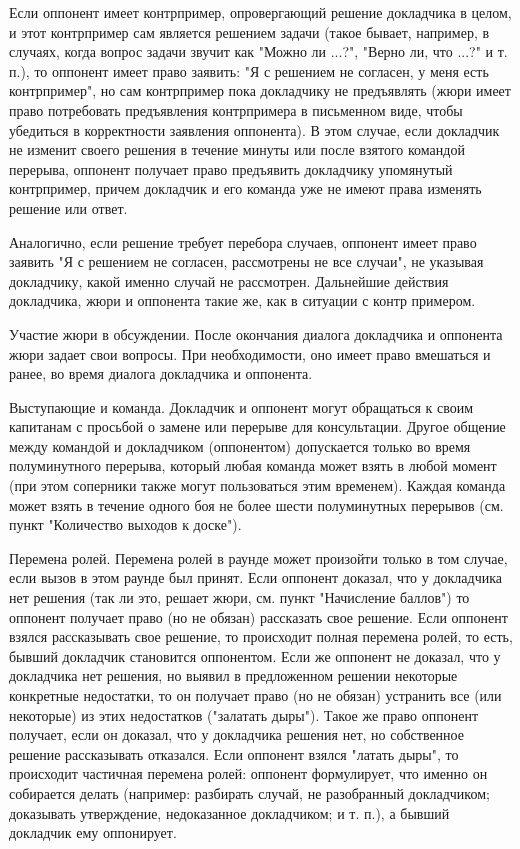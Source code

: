 \documentclass{article}
\begin{document}
Если оппонент имеет контрпример, опровергающий решение докладчика в целом, и этот контрпример сам является решением задачи (такое бывает, например, в случаях, когда вопрос задачи звучит как "Можно ли ...?", "Верно ли, что ...?" и т. п.), то оппонент имеет право заявить: "Я с решением не согласен, у меня есть контрпример", но сам контрпример пока докладчику не предъявлять (жюри имеет право потребовать предъявления контрпримера в письменном виде, чтобы убедиться в корректности заявления оппонента). В этом случае, если докладчик не изменит своего решения в течение минуты или после взятого командой перерыва, оппонент получает право предъявить докладчику упомянутый контрпример, причем докладчик и его команда уже не имеют права изменять решение или ответ.

Аналогично, если решение требует перебора случаев, оппонент имеет право заявить "Я с решением не согласен, рассмотрены не все случаи", не указывая докладчику, какой именно случай не рассмотрен. Дальнейшие действия докладчика, жюри и оппонента такие же, как в ситуации с контр примером.

Участие жюри в обсуждении. После окончания диалога докладчика и оппонента жюри задает свои вопросы. При необходимости, оно имеет право вмешаться и ранее, во время диалога докладчика и оппонента.

Выступающие и команда. Докладчик и оппонент могут обращаться к своим капитанам с просьбой о замене или перерыве для консультации. Другое общение между командой и докладчиком (оппонентом) допускается только во время полуминутного перерыва, который любая команда может взять в любой момент (при этом соперники также могут пользоваться этим временем). Каждая команда может взять в течение одного боя не более шести полуминутных перерывов (см. пункт "Количество выходов к доске").

Перемена ролей. Перемена ролей в раунде может произойти только в том случае, если вызов в этом раунде был принят. Если оппонент доказал, что у докладчика нет решения (так ли это, решает жюри, см. пункт "Начисление баллов") то оппонент получает право (но не обязан) рассказать свое решение. Если оппонент взялся рассказывать свое решение, то происходит полная перемена ролей, то есть, бывший докладчик становится оппонентом. Если же оппонент не доказал, что у докладчика нет решения, но выявил в предложенном решении некоторые конкретные недостатки, то он получает право (но не обязан) устранить все (или некоторые) из этих недостатков ("залатать дыры"). Такое же право оппонент получает, если он доказал, что у докладчика решения нет, но собственное решение рассказывать отказался. Если оппонент взялся "латать дыры", то происходит частичная перемена ролей: оппонент формулирует, что именно он собирается делать (например: разбирать случай, не разобранный докладчиком; доказывать утверждение, недоказанное докладчиком; и т. п.), а бывший докладчик ему оппонирует.
\end{document}
